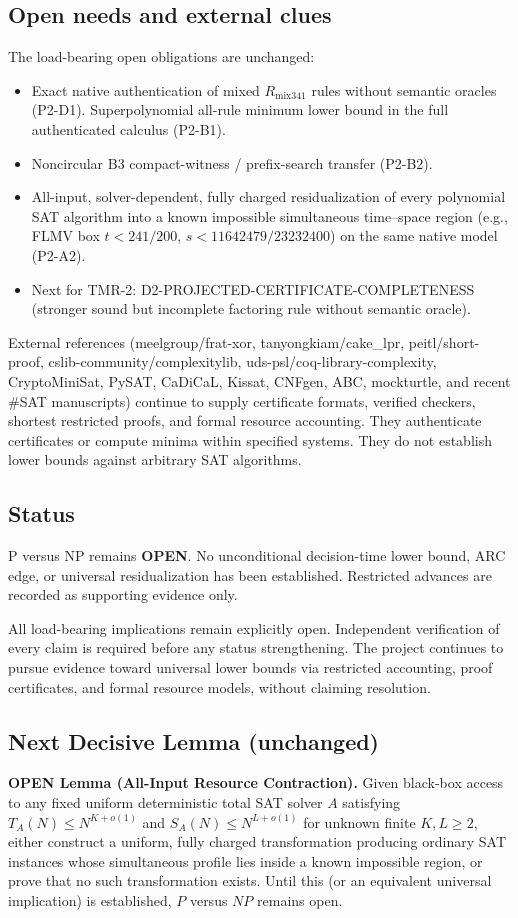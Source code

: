 \documentclass{article}
\begin{document}
\subsection*{Open needs and external clues}
The load-bearing open obligations are unchanged:
\begin{itemize}
\item Exact native authentication of mixed \(R_{\mathrm{mix341}}\) rules without semantic oracles (P2-D1). Superpolynomial all-rule minimum lower bound in the full authenticated calculus (P2-B1).
\item Noncircular B3 compact-witness / prefix-search transfer (P2-B2).
\item All-input, solver-dependent, fully charged residualization of every polynomial SAT algorithm into a known impossible simultaneous time--space region (e.g., FLMV box \(t < 241/200\), \(s < 11642479/23232400\)) on the same native model (P2-A2).
\item Next for TMR-2: D2-PROJECTED-CERTIFICATE-COMPLETENESS (stronger sound but incomplete factoring rule without semantic oracle).
\end{itemize}

External references (meelgroup/frat-xor, tanyongkiam/cake\_lpr, peitl/short-proof, cslib-community/complexitylib, uds-psl/coq-library-complexity, CryptoMiniSat, PySAT, CaDiCaL, Kissat, CNFgen, ABC, mockturtle, and recent \#SAT manuscripts) continue to supply certificate formats, verified checkers, shortest restricted proofs, and formal resource accounting. They authenticate certificates or compute minima within specified systems. They do not establish lower bounds against arbitrary SAT algorithms.

\subsection*{Status}
P versus NP remains \textbf{OPEN}. No unconditional decision-time lower bound, ARC edge, or universal residualization has been established. Restricted advances are recorded as supporting evidence only.

All load-bearing implications remain explicitly open. Independent verification of every claim is required before any status strengthening. The project continues to pursue evidence toward universal lower bounds via restricted accounting, proof certificates, and formal resource models, without claiming resolution.

\subsection*{Next Decisive Lemma (unchanged)}
\textbf{OPEN Lemma (All-Input Resource Contraction).}  
Given black-box access to any fixed uniform deterministic total SAT solver \(A\) satisfying \(T_A(N)\le N^{K+o(1)}\) and \(S_A(N)\le N^{L+o(1)}\) for unknown finite \(K,L\ge 2\), either construct a uniform, fully charged transformation producing ordinary SAT instances whose simultaneous profile lies inside a known impossible region, or prove that no such transformation exists. Until this (or an equivalent universal implication) is established, \(P\) versus \(NP\) remains open.
\end{document}
